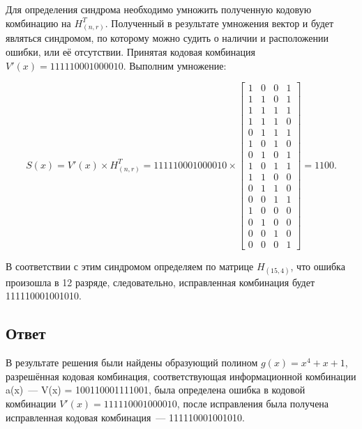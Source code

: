 Для определения синдрома необходимо умножить полученную кодовую
комбинацию на $H^T_{(n, r)}$. Полученный в результате умножения вектор
и будет являться синдромом, по которому можно судить о наличии и
расположении ошибки, или её отсутствии. Принятая кодовая комбинация
$V'(x) = 111110001000010$. Выполним умножение:

\begin{equation*}
  S(x) = V'(x) \times H^T_{(n, r)} = 111110001000010 \times
  \left[
    \begin{array}{cccc}
      1 & 0 & 0 & 1 \\
      1 & 1 & 0 & 1 \\
      1 & 1 & 1 & 1 \\
      1 & 1 & 1 & 0 \\
      0 & 1 & 1 & 1 \\
      1 & 0 & 1 & 0 \\
      0 & 1 & 0 & 1 \\
      1 & 0 & 1 & 1 \\
      1 & 1 & 0 & 0 \\
      0 & 1 & 1 & 0 \\
      0 & 0 & 1 & 1 \\
      1 & 0 & 0 & 0 \\
      0 & 1 & 0 & 0 \\
      0 & 0 & 1 & 0 \\
      0 & 0 & 0 & 1 
    \end{array}
  \right] = 1100.
\end{equation*}

В соответствии с этим синдромом определяем по матрице $H_{(15,4)}$,
что ошибка произошла в 12 разряде, следовательно, исправленная
комбинация будет 111110001001010.

\subsection{Ответ}

В результате решения были найдены образующий полином $g(x) = x^4 + x
+1$, разрешённая кодовая комбинация, соответствующая информационной
комбинации a(x)~--- V(x) = 100110001111001, была определена ошибка в
кодовой комбинации $V'(x) = 111110001000010$, после исправления была
получена исправленная кодовая комбинация~--- 111110001001010.



